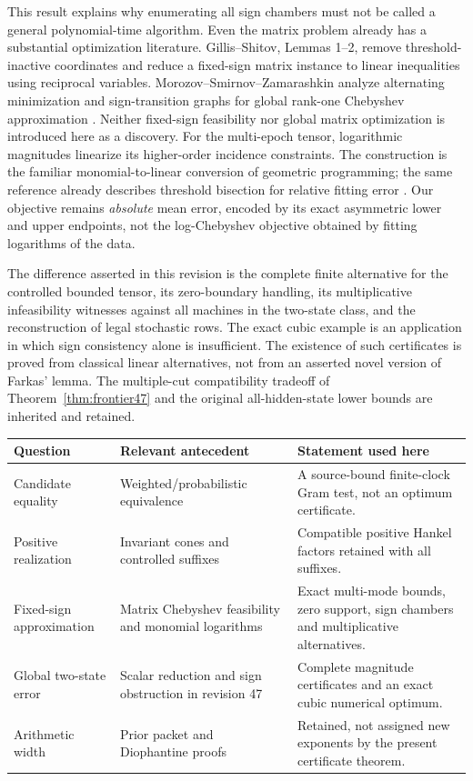 This result explains why enumerating all sign chambers must not be
called a general polynomial-time algorithm. Even the matrix problem
already has a substantial optimization literature. Gillis--Shitov,
Lemmas 1--2, remove threshold-inactive coordinates and reduce a
fixed-sign matrix instance to linear inequalities using reciprocal
variables. Morozov--Smirnov--Zamarashkin analyze alternating
minimization and sign-transition graphs for global rank-one Chebyshev
approximation \cite[Theorem 5.3]{MSZ23}. Neither fixed-sign feasibility
nor global matrix optimization is introduced here as a discovery.
For the multi-epoch tensor, logarithmic magnitudes linearize its
higher-order incidence constraints. The construction is the familiar
monomial-to-linear conversion of geometric programming; the same
reference already describes threshold bisection for relative fitting
error \cite[\S2 and \S8]{BKVH07}. Our objective remains \emph{absolute}
mean error, encoded by its exact asymmetric lower and upper endpoints,
not the log-Chebyshev objective obtained by fitting logarithms of the
data.

The difference asserted in this revision is the complete finite
alternative for the controlled bounded tensor, its zero-boundary
handling, its multiplicative infeasibility witnesses against all
machines in the two-state class, and the reconstruction of legal
stochastic rows. The exact cubic example is an application in which
sign consistency alone is insufficient. The existence of such
certificates is proved from classical linear alternatives, not from
an asserted novel version of Farkas' lemma. The multiple-cut
compatibility tradeoff of Theorem~\ref{thm:frontier47} and the original
all-hidden-state lower bounds are inherited and retained.

\begin{center}
\small
\begin{tabular}{p{}p{}p{}}
\toprule
Question & Relevant antecedent & Statement used here\\\midrule
Candidate equality & Weighted/probabilistic equivalence
\cite{Tzeng92,BPP15} & A source-bound finite-clock Gram test, not an optimum certificate.\\[3pt]
Positive realization & Invariant cones and controlled suffixes
\cite{BF04,GTF33} & Compatible positive Hankel factors retained with all suffixes.\\[3pt]
Fixed-sign approximation & Matrix Chebyshev feasibility
\cite{GS19} and monomial logarithms \cite{BKVH07} & Exact multi-mode bounds, zero support, sign chambers and multiplicative alternatives.\\[3pt]
Global two-state error & Scalar reduction and sign obstruction in revision 47
\cite{GTF47} & Complete magnitude certificates and an exact cubic numerical optimum.\\[3pt]
Arithmetic width & Prior packet and Diophantine proofs
\cite{GTF35,GTF42,GTF43} & Retained, not assigned new exponents by the present certificate theorem.\\
\bottomrule
\end{tabular}
\end{center}

